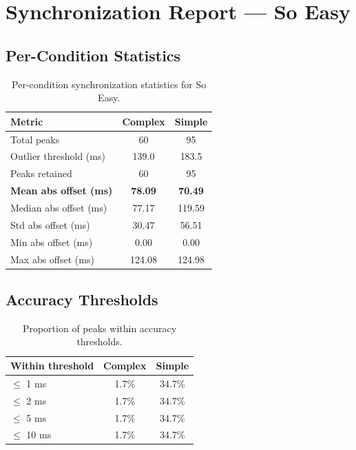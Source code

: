 
\section*{Synchronization Report --- So Easy}

\subsection*{Per-Condition Statistics}

\begin{table}[h!]
\centering
\begin{tabular}{|l|c|c|}
\hline
Metric & Complex & Simple \\
\hline
Total peaks & 60 & 95 \\
Outlier threshold (ms) & 139.0 & 183.5 \\
Peaks retained & 60 & 95 \\
\textbf{Mean abs offset (ms)} & \textbf{78.09} & \textbf{70.49} \\
Median abs offset (ms) & 77.17 & 119.59 \\
Std abs offset (ms) & 30.47 & 56.51 \\
Min abs offset (ms) & 0.00 & 0.00 \\
Max abs offset (ms) & 124.08 & 124.98 \\
\hline
\end{tabular}
\caption{Per-condition synchronization statistics for So Easy.}
\label{tab:sync_stats}
\end{table}

\subsection*{Accuracy Thresholds}

\begin{table}[h!]
\centering
\begin{tabular}{|l|c|c|}
\hline
Within threshold & Complex & Simple \\
\hline
$\leq$ 1 ms & 1.7\% & 34.7\% \\
$\leq$ 2 ms & 1.7\% & 34.7\% \\
$\leq$ 5 ms & 1.7\% & 34.7\% \\
$\leq$ 10 ms & 1.7\% & 34.7\% \\
\hline
\end{tabular}
\caption{Proportion of peaks within accuracy thresholds.}
\label{tab:sync_accuracy}
\end{table}

